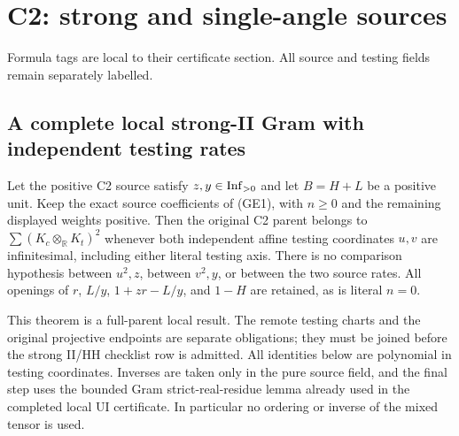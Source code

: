 \chapter{C2: strong and single-angle sources}
\label{ch:cert-6}
Formula tags are local to their certificate section. All source and testing fields remain separately labelled.

\section{\texorpdfstring{A complete local strong-II Gram with independent testing rates}{A complete local strong-II Gram with independent testing rates}}
\label{component:pe16499ccc4c6}

\label{pe16499ccc4c6:sec:r7-local-strong-II}

\begin{theorem}
Let the positive C2 source satisfy $z,y\in\operatorname{Inf}_{>0}$ and let
$B=H+L$ be a positive unit.  Keep the exact source coefficients of
(GE1), with $n\geq0$ and the remaining displayed weights positive.
Then the original C2 parent belongs to $\sum(K_c\otimes_{\mathbb R}
K_t)^2$ whenever both independent affine testing coordinates $u,v$
are infinitesimal, including either literal testing axis.
There is no comparison hypothesis between $u^2,z$, between $v^2,y$,
or between the two source rates.  All openings of $r$, $L/y$,
$1+zr-L/y$, and $1-H$ are retained, as is literal $n=0$.
\end{theorem}

This theorem is a full-parent local result.  The remote testing charts
and the original projective endpoints are separate obligations; they
must be joined before the strong II/HH checklist row is admitted.
All identities below are polynomial in testing coordinates.  Inverses
are taken only in the pure source field, and the final step uses the
bounded Gram strict-real-residue lemma already used in the completed
local UI certificate.  In particular no ordering or inverse of the
mixed tensor is used.

